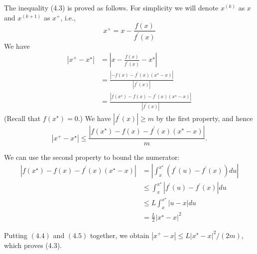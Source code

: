 The inequality (4.3) is proved as follows. For simplicity we will denote $ x^{(k)} $ as $ x $ and $ x^{(k+1)} $ as $ x^{+} $, i.e.,
\begin{equation}
x^{+}=x-\frac{f(x)}{f^{\prime}(x)}
\end{equation}
We have
\begin{equation}
\begin{aligned}
\left|x^{+}-x^{\star}\right| &=\left|x-\frac{f(x)}{f^{\prime}(x)}-x^{\star}\right| \\
&=\frac{\left|-f(x)-f^{\prime}(x)\left(x^{\star}-x\right)\right|}{\left|f^{\prime}(x)\right|} \\
&=\frac{\left|f\left(x^{\star}\right)-f(x)-f^{\prime}(x)\left(x^{\star}-x\right)\right|}{\left|f^{\prime}(x)\right|}
\end{aligned}
\end{equation}
(Recall that $ f\left(x^{\star}\right)=0 $.) We have $ \left|f^{\prime}(x)\right| \geq m $ by the first property, and hence
\begin{equation}
\left|x^{+}-x^{\star}\right| \leq \frac{\left|f\left(x^{\star}\right)-f(x)-f^{\prime}(x)\left(x^{\star}-x\right)\right|}{m} .
\end{equation}

We can use the second property to bound the numerator:
\begin{equation}
\begin{aligned}
\left|f\left(x^{\star}\right)-f(x)-f^{\prime}(x)\left(x^{\star}-x\right)\right| &=\left|\int_{x}^{x^{\star}}\left(f^{\prime}(u)-f^{\prime}(x)\right) d u\right| \\
& \leq \int_{x}^{x^{\star}}\left|f^{\prime}(u)-f^{\prime}(x)\right| d u \\
& \leq L \int_{x}^{x^{\star}}|u-x| d u \\
&=\frac{L}{2}\left|x^{\star}-x\right|^{2}
\end{aligned}
\end{equation}

Putting $ (4.4) $ and $ (4.5) $ together, we obtain $ \left|x^{+}-x\right| \leq L\left|x^{\star}-x\right|^{2} /(2 m) $, which proves (4.3).


